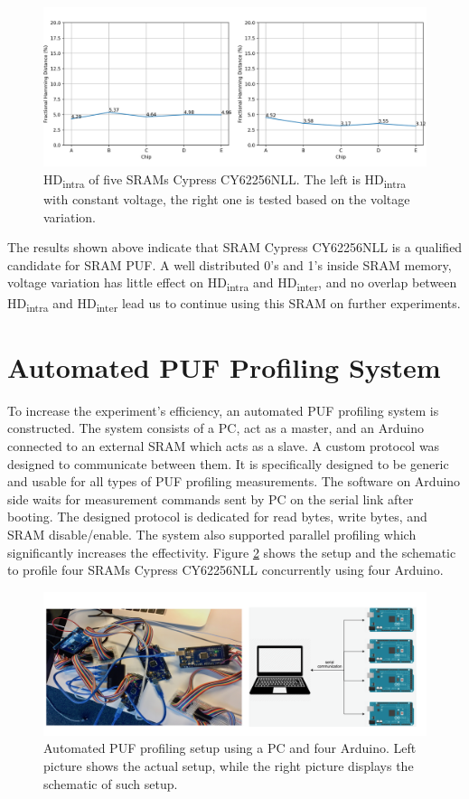 \begin{figure}[tph!]
    \centerline{\includegraphics[width={\textwidth}]{images/cy62256nll_hd_intra}}
    \caption{HD\textsubscript{intra} of five SRAMs Cypress CY62256NLL. The left is HD\textsubscript{intra} with constant voltage, the right one is tested based on the voltage variation.}
    \label{fig:cy62256nll_hd_intra}
\end{figure}

The results shown above indicate that SRAM Cypress CY62256NLL is a qualified candidate for SRAM PUF. A well distributed 0's and 1's inside SRAM memory, voltage variation has little effect on HD\textsubscript{intra} and HD\textsubscript{inter}, and no overlap between HD\textsubscript{intra} and HD\textsubscript{inter} lead us to continue using this SRAM on further experiments.

\section{Automated PUF Profiling System}
To increase the experiment's efficiency, an automated PUF profiling system is constructed. The system consists of a PC, act as a master, and an Arduino connected to an external SRAM which acts as a slave. A custom protocol was designed to communicate between them. It is specifically designed to be generic and usable for all types of PUF profiling measurements. The software on Arduino side waits for measurement commands sent by PC on the serial link after booting. The designed protocol is dedicated for read bytes, write bytes, and SRAM disable/enable. The system also supported parallel profiling which significantly increases the effectivity. Figure \ref{fig:puf_profiling} shows the setup and the schematic to profile four SRAMs Cypress CY62256NLL concurrently using four Arduino.

\begin{figure}[tph!]
    \centerline{\includegraphics[width={\textwidth}]{images/setup}}
    \caption{Automated PUF profiling setup using a PC and four Arduino. Left picture shows the actual setup, while the right picture displays the schematic of such setup.}
    \label{fig:puf_profiling}
\end{figure}


